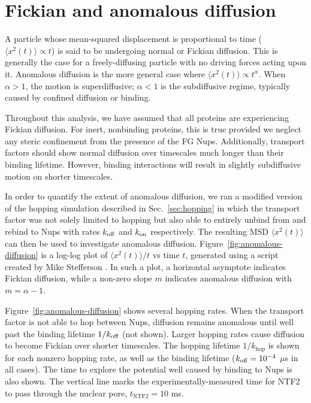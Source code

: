 \section{Fickian and anomalous diffusion}
\label{sec:fickian}
A particle whose mean-squared displacement is proportional to time ($\langle x^2(t) \rangle \propto t$) is said to be undergoing normal or Fickian diffusion.  This is generally the case for a freely-diffusing particle with no driving forces acting upon it.  Anomalous diffusion is the more general case where $\langle x^2(t)\rangle \propto t^\alpha$.  When $\alpha > 1$, the motion is superdiffusive; $\alpha < 1$ is the subdiffusive regime, typically caused by confined diffusion or binding.

Throughout this analysis, we have assumed that all proteins are experiencing Fickian diffusion.  For inert, nonbinding proteins, this is true provided we neglect any steric confinement from the presence of the FG Nups.  Additionally, transport factors should show normal diffusion over timescales much longer than their binding lifetime.  However, binding interactions will result in slightly subdiffusive motion on shorter timescales.

In order to quantify the extent of anomalous diffusion, we ran a modified version of the hopping simulation described in Sec.~\ref{sec:hopping} in which the transport factor was not solely limited to hopping but also able to entirely unbind from and rebind to Nups with rates $k_{\rm off}$ and $k_{\rm on}$ respectively.   The resulting MSD $\langle x^2(t) \rangle$ can then be used to investigate anomalous diffusion.  Figure~\ref{fig:anomalous-diffusion} is a log-log plot of $\langle x^2(t) \rangle/t$ vs time $t$, generated using a script created by Mike Stefferson \cite{stefferson18}.  In such a plot, a horizontal asymptote indicates Fickian diffusion, while a non-zero slope $m$ indicates anomalous diffusion with $m = \alpha -1$.

Figure~\ref{fig:anomalous-diffusion} shows several hopping rates.  When the transport factor is not able to hop between Nups, diffusion remains anomalous until well past the binding lifetime $1/k_{\rm off}$ (not shown).  Larger hopping rates cause diffusion to become Fickian over shorter timescales.  The hopping lifetime $1/k_\mathrm{hop}$ is shown for each nonzero hopping rate, as well as the binding lifetime ($k_{\rm off} = 10^{-4}$ $\mu$s in all cases).  The time to explore the potential well caused by binding to Nups is also shown.  The vertical line marks the experimentally-measured time for NTF2 to pass through the nuclear pore, $t_\mathrm{NTF2} = 10$ ms.

